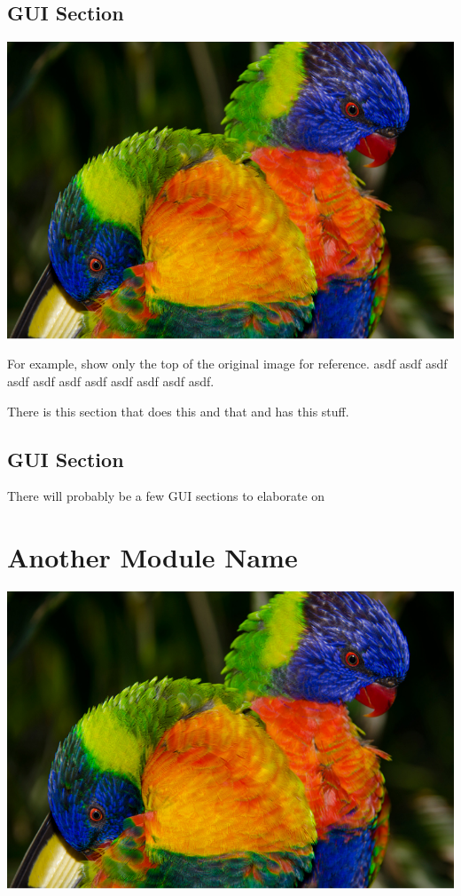 \documentclass{scrreprt}
\begin{document}
\section{GUI Section}

\includegraphics[trim={0 10cm 0 0},clip,width=\textwidth]{sample}

For example, show only the top of the original image for reference. asdf asdf asdf
asdf asdf asdf asdf asdf asdf asdf asdf.

There is this section that does this and that and has this stuff.

\section{GUI Section}
There will probably be a few GUI sections to elaborate on

\chapter{Another Module Name}

\includegraphics[width=\textwidth]{sample}
\end{document}
